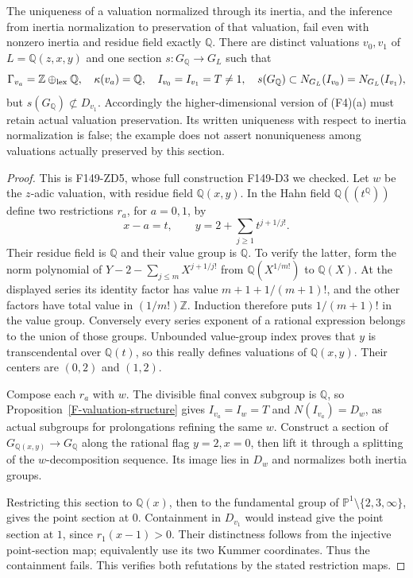 \begin{proposition}
\label{F-valuation-nonuniqueness}
The uniqueness of a valuation normalized through its inertia,
and the inference from inertia normalization to preservation
of that valuation, fail even with nonzero inertia and residue
field exactly $\mathbb Q$. There are distinct valuations
$v_0,v_1$ of $L=\mathbb Q(z,x,y)$ and one section
$s:G_{\mathbb Q}\to G_L$ such that
\[
 \Gamma_{v_a}=\mathbb Z\oplus_{\rm lex}\mathbb Q,
 \quad\kappa(v_a)=\mathbb Q,
 \quad I_{v_0}=I_{v_1}=T\ne1,
 \quad s(G_{\mathbb Q})\subset N_{G_L}(I_{v_0})
                             =N_{G_L}(I_{v_1}),
\]
but $s(G_{\mathbb Q})\not\subset D_{v_1}$. Accordingly the
higher-dimensional version of (F4)(a) must retain actual
valuation preservation. Its written uniqueness with respect to
inertia normalization is false; the example does not assert
nonuniqueness among valuations actually preserved by this section.
\end{proposition}
\begin{proof}
This is F149-ZD5, whose full construction F149-D3 we checked.
Let $w$ be the $z$-adic valuation, with residue field
$\mathbb Q(x,y)$. In the Hahn field $\mathbb Q((t^{\mathbb Q}))$
define two restrictions $r_a$, for $a=0,1$, by
\[
 x-a=t,\qquad y=2+\sum_{j\ge1}t^{j+1/j!}.
\]
Their residue field is $\mathbb Q$ and their value group is
$\mathbb Q$. To verify the latter, form the norm polynomial
of $Y-2-\sum_{j\le m}X^{j+1/j!}$ from
$\mathbb Q(X^{1/m!})$ to $\mathbb Q(X)$. At the displayed
series its identity factor has value
$m+1+1/(m+1)!$, and the other factors have total value in
$(1/m!)\mathbb Z$. Induction therefore puts $1/(m+1)!$ in
the value group. Conversely every series exponent of a
rational expression belongs to the union of those groups.
Unbounded value-group index proves that $y$ is transcendental
over $\mathbb Q(t)$, so this really defines valuations of
$\mathbb Q(x,y)$. Their centers are $(0,2)$ and $(1,2)$.

Compose each $r_a$ with $w$. The divisible final convex
subgroup is $\mathbb Q$, so
Proposition~\ref{F-valuation-structure} gives
$I_{v_a}=I_w=T$ and $N(I_{v_a})=D_w$, as actual subgroups
for prolongations refining the same $w$. Construct a section
of $G_{\mathbb Q(x,y)}\to G_{\mathbb Q}$ along the rational
flag $y=2,x=0$, then lift it through a splitting of the
$w$-decomposition sequence. Its image lies in $D_w$ and
normalizes both inertia groups.

Restricting this section to $\mathbb Q(x)$, then to the
fundamental group of
$\mathbb P^1\setminus\{2,3,\infty\}$, gives the point
section at $0$. Containment in $D_{v_1}$ would instead give
the point section at $1$, since $r_1(x-1)>0$. Their distinctness
follows from the injective point-section map; equivalently
use its two Kummer coordinates. Thus the containment fails.
This verifies both refutations by the stated restriction maps.
\end{proof}

